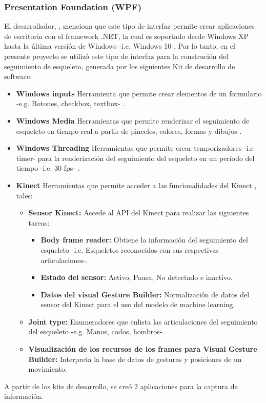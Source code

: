 \subsubsection{Presentation Foundation (WPF)}
\label{ins:UI:wpf}
El desarrollador, , menciona que este tipo de interfaz permite crear aplicaciones de escritorio con el framework .NET, la cual es soportado desde Windows XP hasta la \'ultima versi\'on de Windows -i.e. Windows 10-. Por lo tanto, en el presente proyecto se utiliz\'o este tipo de interfaz para la construci\'on del seguimiento de esqueleto, generada por los siguientes Kit de desarrollo de software:
\begin{itemize}
	\item \textbf{Windows inputs} Herramienta que permite crear elementos de un formulario -e.g. Botones, checkbox, textbox- \cite{wpfWindows2019}.
	\item \textbf{Windows Media} Herramientas que permite renderizar el seguimiento de esqueleto en tiempo real a partir de pinceles, colores, formas y dibujos \cite{WindowMedia2019}.
	\item \textbf{Windows Threading} Herramientas que permite crear temporizadores -i.e timer- para la renderizaci\'on del seguimiento del esqueleto en un per\'iodo del tiempo -i.e. 30 fps- \cite{WindowThreading2019}.
	\item \textbf{Kinect} Herramientas que permite acceder a las funcionalidades del Kinect \cite{WindowKinect2019}, tales:
	\begin{itemize}
	\item \textbf{Sensor Kinect:} Accede al API del Kinect para realizar las siguientes tareas:
		\begin{itemize}
				\item \textbf{Body frame reader:} Obtiene la informaci\'on del seguimiento del esqueleto -i.e. Esqueletos reconocidos con sus respectivas articulaciones-.
				\item \textbf{Estado del sensor:} Activo, Pausa, No detectado e inactivo.
				\item \textbf{Datos del visual Gesture Builder:} Normalizaci\'on de datos del sensor del Kinect para el uso del modelo de machine learning.
		\end{itemize}	
			\item \textbf{Joint type:} Enumeradores que enlista las articulaciones del seguimiento del esqueleto -e.g. Manos, codos, hombros-.
			\item \textbf{Visualizaci\'on de los recursos de los frames para Visual Gesture Builder:} Interpreta la base de datos de gesturas y posiciones de un movimiento.
	\end{itemize}	 
\end{itemize}
A partir de los kits de desarrollo, se cre\'o 2 aplicaciones para la captura de informaci\'on.

